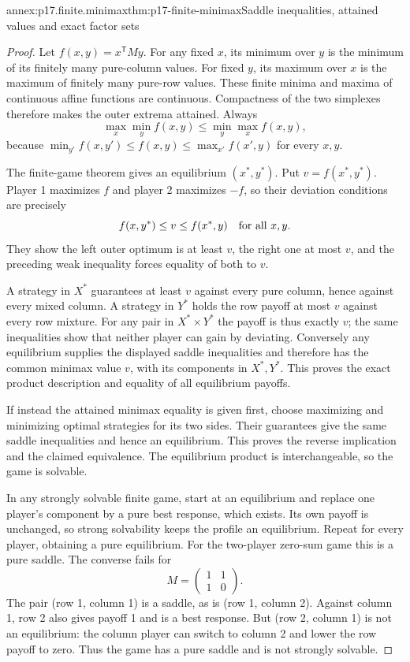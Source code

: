 \begin{annexitem}{annex:p17.finite.minimax}{thm:p17-finite-minimax}{Saddle inequalities, attained values and exact factor sets}
\begin{proof}
Let \(f(x,y)=x^{\mathsf T}My\).
For any fixed \(x\), its minimum over \(y\)
is the minimum of its finitely many pure-column
values. For fixed \(y\), its maximum over
\(x\) is the maximum of finitely many
pure-row values. These finite minima and
maxima of continuous affine functions are
continuous. Compactness of the two simplexes
therefore makes the outer extrema attained.
Always
\[
           \max_x\min_y f(x,y)\leq\min_y\max_x f(x,y),
\]
because \(\min_{y'}f(x,y')\leq f(x,y)\leq
\max_{x'}f(x',y)\) for every \(x,y\).

The finite-game theorem gives an equilibrium
\((x^*,y^*)\). Put \(v=f(x^*,y^*)\).
Player 1 maximizes \(f\) and player 2
maximizes \(-f\), so their deviation
conditions are precisely
\[
                    f(x,y^*)\leq v\leq f(x^*,y)
                                      \quad\hbox{for all }x,y.
\]
They show the left outer optimum is
at least \(v\), the right one at most
\(v\), and the preceding weak inequality
forces equality of both to \(v\).

A strategy in \(X^*\) guarantees at
least \(v\) against every pure column,
hence against every mixed column.
A strategy in \(Y^*\) holds the row
payoff at most \(v\) against every row
mixture. For any pair in \(X^*\times Y^*\)
the payoff is thus exactly \(v\);
the same inequalities show that neither
player can gain by deviating. Conversely
any equilibrium supplies the displayed
saddle inequalities and therefore has
the common minimax value \(v\), with its
components in \(X^*,Y^*\).
This proves the exact product description
and equality of all equilibrium payoffs.

If instead the attained minimax equality
is given first, choose maximizing and
minimizing optimal strategies for its
two sides. Their guarantees give the
same saddle inequalities and hence
an equilibrium. This proves the reverse
implication and the claimed equivalence.
The equilibrium product is interchangeable,
so the game is solvable.

In any strongly solvable finite game,
start at an equilibrium and replace
one player's component by a pure best
response, which exists. Its own payoff
is unchanged, so strong solvability
keeps the profile an equilibrium.
Repeat for every player, obtaining a
pure equilibrium. For the two-player
zero-sum game this is a pure saddle.
The converse fails for
\[
                            M=\begin{pmatrix}1&1\\1&0\end{pmatrix}.
\]
The pair (row 1, column 1) is a saddle,
as is (row 1, column 2).
Against column 1, row 2 also gives
payoff 1 and is a best response.
But (row 2, column 1) is not an
equilibrium: the column player can
switch to column 2 and lower the
row payoff to zero. Thus the
game has a pure saddle and is
not strongly solvable.
\end{proof}
\end{annexitem}

